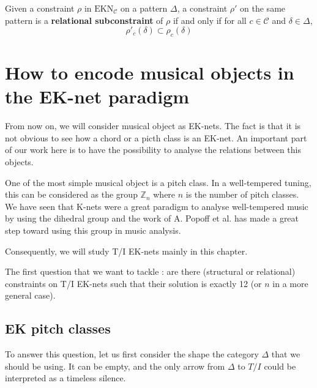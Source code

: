 \begin{defn}
    Given a constraint $\rho$ in $\text{EKN}_\mathcal{C}$ on a pattern $\Delta$, a constraint $\rho'$ on the same pattern is a \textbf{relational subconstraint} of $\rho$ if and only if for all $c\in \mathcal{C}$ and $\delta\in\Delta$,
    $$\rho'_c(\delta)\subset\rho_c(\delta)$$
\end{defn}










\section{How to encode musical objects in the EK-net paradigm}

From now on, we will consider musical object as EK-nets. The fact is that it is not obvious to see how a chord or a picth class is an EK-net. An important part of our work here is to have the possibility to analyse the relations between this objects.

One of the most simple musical object is a pitch class. In a well-tempered tuning, this can be considered as the group $\mathbb{Z}_n$ where $n$ is the number of pitch classes. We have seen that K-nets were a great paradigm to analyse well-tempered music by using the dihedral group and the work of  A. Popoff et al.\cite{PAAE2016} has made a great step toward using this group in music analysis.

Consequently, we will study T/I EK-nets mainly in this chapter.

The first question that we want to tackle : are there (structural or relational) constraints on T/I EK-nets such that their solution is exactly 12 (or $n$ in a more general case).

\subsection{EK pitch classes}

To answer this question, let us first consider the shape the category $\Delta$ that we should be using. It can be empty, and the only arrow from $\Delta$ to $T/I$ could be interpreted as a timeless silence.

